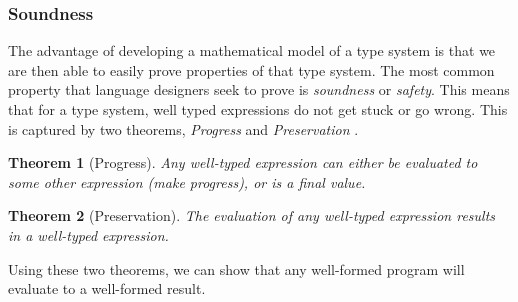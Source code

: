 \documentclass[11pt
              , a4paper
              , twoside
              , openright
              ]{report}
\newtheorem{theorem}{Theorem}
\numberwithin{case}{theorem}
\numberwithin{subcase}{case}
\begin{document}
\subsubsection{Soundness}
The advantage of developing a mathematical model of a type system is that we are then able to easily prove properties of that type system. The most common property that language designers seek to prove is \emph{soundness} or \emph{safety}. This means that for a type system, well typed expressions do not get stuck or go wrong. This is captured by two theorems, \emph{Progress} and \emph{Preservation} \cite{Wright:1994:SAT:191905.191909, Pierce:2002:TPL:509043}.
\begin{theorem}[Progress]\label{th:progress}
Any well-typed expression can either be evaluated to some other expression (make progress), or is a final value.
\end{theorem}
\begin{theorem}[Preservation]\label{th:preservation}
The evaluation of any well-typed expression results in a well-typed expression.
\end{theorem}
Using these two theorems, we can show that any well-formed program will evaluate to a well-formed result.
\end{document}
